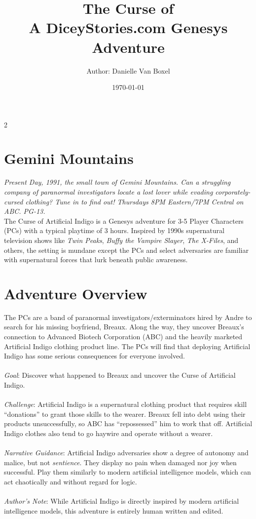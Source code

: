 \documentclass{book}
\title{
    The Curse of \ai \\
A DiceyStories.com Genesys Adventure\\
}
\author{Author: Danielle Van Boxel}
\date{\today}
\newcommand{\ai}{{\color{cyan}Artificial Indigo}\xspace}
\begin{document}
\maketitle


\begin{multicols*}{2}
\section{Gemini Mountains}

\emph{Present Day, 1991, the small town of Gemini Mountains.  Can a struggling company of paranormal investigators locate a lost lover while evading corporately-cursed clothing?  Tune in to find out!  Thursdays 8PM Eastern/7PM Central on ABC.  PG-13.}\\

    The Curse of \ai is a Genesys adventure for 3-5 Player Characters (PCs) with a typical playtime of 3 hours.  Inspired by 1990s supernatural television shows like \emph{Twin Peaks}, \emph{Buffy the Vampire Slayer}, \emph{The X-Files}, and others, the setting is mundane except the PCs and select adversaries are familiar with supernatural forces that lurk beneath public awareness.

\section{Adventure Overview}

    The PCs are a band of paranormal investigators/exterminators hired by Andre to search for his missing boyfriend, Breaux.  Along the way, they uncover Breaux's connection to Advanced Biotech Corporation (ABC) and the heavily marketed \ai clothing product line.  The PCs will find that deploying \ai has some serious consequences for everyone involved.\\
\\
\emph{Goal}: Discover what happened to Breaux and uncover the Curse of \ai.\\
\\
\emph{Challenge}: \ai is a supernatural clothing product that requires skill ``donations'' to grant those skills to the wearer.  Breaux fell into debt using their products unsuccessfully, so ABC has ``repossessed'' him to work that off.  \ai clothes also tend to go haywire and operate without a wearer.\\
\\
\emph{Narrative Guidance}: \ai adversaries show a degree of autonomy and malice, but not \emph{sentience}.  They display no pain when damaged nor joy when successful.  Play them similarly to modern artificial intelligence models, which can act chaotically and without regard for logic.\\
\\
\emph{Author's Note}: While \ai is directly inspired by modern artificial intelligence models, this adventure is entirely human written and edited.  


\end{multicols*}
\end{document}
